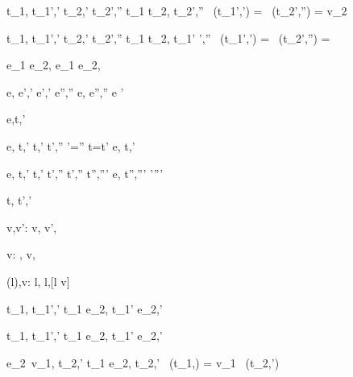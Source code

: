   { {t_1,{\sigma}  {\stride} {t_1}',{\sigma}'}\Quad
   {t_2,{\sigma}' {\stride} {t_2}',{\sigma}''}}
  {t_1 \Or t_2,{\sigma} {\stride} {t_2}',{\sigma}''}
  {\Value\ ({t_1}',{\sigma}') = \bot \land \Value\ ({t_2}',{\sigma}'') = {v_2}}

  { {t_1,{\sigma}  {\stride }{t_1}',{\sigma}'}\Quad
   { t_2,{\sigma' }{\stride} {t_2}',{\sigma}''}}
  {t_1 \Or t_2,{\sigma} {\stride} {t_1}' ',{\sigma}''}
  {\Value\ ({t_1}',{\sigma}') = \bot \land \Value\ ({t_2}',{\sigma}'') = \bot }


  { }
  {e_1 \Xor e_2,{\sigma} {\stride} e_1 \Xor e_2,{\sigma}}
  {}

  {e,{\sigma} {\eval} {e}',{\sigma}'  \Quad
   e',{\sigma}' {\stride} {e}'',{\sigma}''}
  {e,{\sigma} {\stride} {e}'',{\sigma}''}
  {e '}



  {e,\sigma \normalise t,\sigma'}


  { {e,{\sigma} {\eval} {t},{\sigma}'}\Quad
   { {t,\sigma' \stride t',\sigma''}\Quad
   {\sigma'=\sigma'' \land t=t'}}}
  {e,{\sigma} {\normalise} {t},{\sigma}'}
  {}

  { e,{\sigma} {\eval} {t},{\sigma}'\Quad
    t,\sigma' \stride t',{\sigma}''\Quad
    t',\sigma'' \normalise t'',\sigma'''}
  {e,{\sigma} {\normalise} {t}'',{\sigma}'''}
  {{\sigma}'\neq {\sigma}'''}



  {t,\sigma {} t',\sigma'}


  {v,v':\beta}
  {\Edit v,{\sigma}  \Edit v',{\sigma}}
  {}

  { v:\beta}
  {\Enter \beta,{\sigma}  \Edit v,{\sigma}}
  {}

  {\sigma(l),v:\beta }
  {\Update l,{\sigma}  \Update l,{\sigma}[l \mapsto v]}
  {}

  {t_1,\sigma {} {t_1'},\sigma'}
  {t_1 \Then e_2,\sigma {} {t_1'} \Then e_2,\sigma'}
  {}

  {t_1,\sigma {} {t_1'},\sigma'}
  {t_1 \Next e_2,\sigma {} {t_1'} \Next e_2,\sigma'}
  {}

  { {e_2\ {v_1},\sigma {\normalise} {t_2},{\sigma}'}}
  {t_1 \Next e_2,\sigma \xrightarrow[]{\Continue} {t_2},{\sigma}'}
  {\Value\ {(t_1,\sigma)} = {v_1} \land \neg\Failing\ ({t_2},{\sigma}')}

